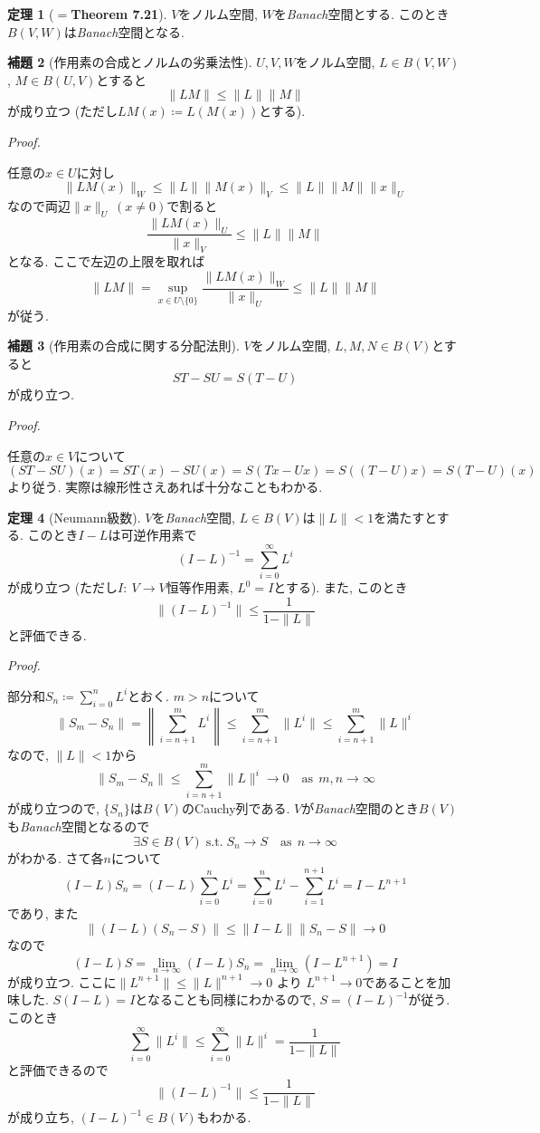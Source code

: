 \documentclass{jsarticle}
\renewenvironment{proof}[1][Proof]{%
\begin{proofbox}%
\textit{#1. }\ignorespaces
}{%
\hfill\qedsymbol%
\end{proofbox}%
}
\theoremstyle{definition}
\newtheorem{thm}{定理}[section]
\newtheorem{lem}[thm]{補題}
\begin{document}
\begin{thm}[$=$\textbf{Theorem 7.21}]
$V$をノルム空間, $W$を\textit{Banach}空間とする. このとき$B(V, W)$は\textit{Banach}空間となる.
\end{thm}

\begin{lem}[作用素の合成とノルムの劣乗法性]
$U, V, W$をノルム空間, $L\in B(V, W)$, $M\in B(U, V)$とすると
\[
\|LM\|\le\|L\|\|M\|
\]
が成り立つ (ただし$LM(x)\coloneq L(M(x))$とする).
\end{lem}
\begin{proof}
任意の$x\in U$に対し
\[
\|LM(x)\|_{W}\le\|L\|\|M(x)\|_V\le \|L\|\|M\|\|x\|_U
\]
なので両辺$\|x\|_U\:(x\neq 0)$で割ると
\[
\dfrac{\|LM(x)\|_U}{\|x\|_V}\le\|L\|\|M\|
\]
となる. ここで左辺の上限を取れば
\[
\|LM\| = \sup_{x\in U\setminus\{0\}} \dfrac{\|LM(x)\|_W}{\|x\|_U}\le\|L\|\|M\|
\]
が従う.
\end{proof}

\begin{lem}[作用素の合成に関する分配法則]
$V$をノルム空間, $L, M, N\in B(V)$とすると
\[
ST-SU=S(T-U)
\]
が成り立つ.
\end{lem}
\begin{proof}
任意の$x\in V$について
\[
(ST-SU)(x) = ST(x)-SU(x) = S(Tx-Ux) = S((T-U)x) = S(T-U)(x)
\]
より従う. 実際は線形性さえあれば十分なこともわかる.
\end{proof}


\begin{thm}[Neumann級数]
$V$を\textit{Banach}空間, $L\in B(V)$は$\|L\|<1$を満たすとする. このとき$I-L$は可逆作用素で
\[
(I-L)^{-1} = \sum_{i=0}^{\infty} L^i
\]
が成り立つ (ただし$I\colon\: V\to V$恒等作用素, $L^0 = I$とする). また, このとき
\[
\|(I-L)^{-1}\| \le \dfrac{1}{1-\|L\|}
\]
と評価できる.
\end{thm}
\begin{proof}
部分和$S_n\coloneq \sum_{i=0}^{n} L^i$とおく. $m>n$について
\[
\|S_m-S_n\| = \left\lVert \sum_{i=n+1}^{m} L^i \right\rVert \le \sum_{i=n+1}^{m} \|L^i\|\le\sum_{i=n+1}^{m} \|L\|^i
\]
なので, $\|L\|<1$から
\[
\|S_m-S_n\| \le \sum_{i=n+1}^{m} \|L\|^i \to 0 \hspace{1em} \text{as}\:\:m, n \to \infty
\]
が成り立つので, $\{S_n\}$は$B(V)$のCauchy列である. $V$が\textit{Banach}空間のとき$B(V)$も\textit{Banach}空間となるので
\[
\exists S\in B(V)\;\text{s.t.}\;S_n \to S \hspace{1em} \text{as}\:\:n\to \infty
\]
がわかる. さて各$n$について
\[
(I-L)S_n=(I-L)\sum_{i=0}^{n} L^i = \sum_{i=0}^{n} L^i  - \sum_{i=1}^{n+1} L^i = I - L^{n+1} 
\]
であり, また
\[
\|(I-L)(S_n-S)\|\le \|I-L\|\|S_n-S\| \to 0 
\]
なので
\[
(I-L)S = \lim_{n\to\infty}(I-L)S_n =\lim_{n\to\infty}(I-L^{n+1}) = I
\]
が成り立つ. ここに$\|L^{n+1}\| \le \|L\|^{n+1} \to 0$ より $L^{n+1}\to 0$であることを加味した. $S(I-L)=I$となることも同様にわかるので, $S=(I-L)^{-1}$が従う. このとき
\[
\sum_{i=0}^\infty \|L^i\| \le \sum_{i=0}^\infty \|L\|^i  = \dfrac{1}{1-\|L\|}
\]
と評価できるので
\[
\|(I-L)^{-1}\| \le \dfrac{1}{1-\|L\|}
\]
が成り立ち, $(I-L)^{-1}\in B(V)$もわかる.
\end{proof}
\end{document}
